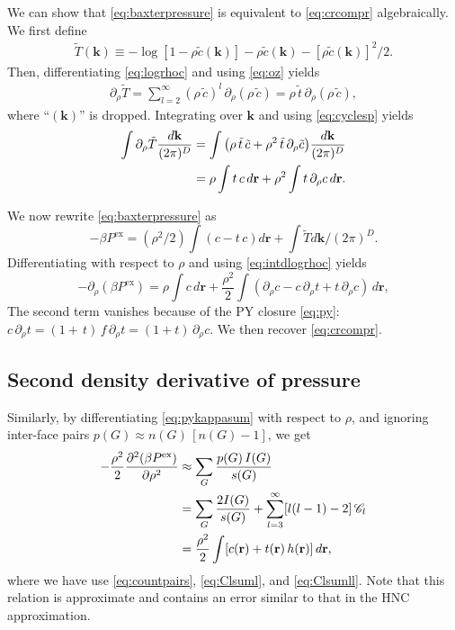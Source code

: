 \documentclass[notitlepage,preprint]{revtex4-1}
\newcommand{\vct}[1]{\mathbf{#1}}
\providecommand{\vr}{} %
\renewcommand{\vr}{\vct{r}}
\newcommand{\vk}{\vct{k}}
\newcommand{\dvk}{\frac{d\vk}{(2\pi)^D}}
\newcommand{\supex}[1]{ { { #1 }^{ \mathrm{ex} } } }
\newcommand{\Pex}{\supex{P}}
\newcommand{\Chn}{\mathscr{C}}
\begin{document}
We can show that
  \eqref{eq:baxterpressure} is equivalent to \eqref{eq:crcompr}
  algebraically.
%
We first define
%
\begin{align}
  \tilde{T}(\vk)
\equiv
  - \log[1 - \rho \tilde{c}(\vk)]
  - \rho \tilde{c}(\vk)
  - \left[ \rho \tilde{c}(\vk) \right]^2 / 2.
  \label{eq:logrhoc}
\end{align}
%
Then, differentiating \eqref{eq:logrhoc} and using \eqref{eq:oz} yields
%
\begin{align*}
  \partial_\rho \tilde T
=
  \sum_{l = 2}^{\infty}
    ( \rho \, \tilde{c} )^l
    \, \partial_\rho ( \rho \, \tilde{c} )
=
  \rho \, \tilde{t}
  \, \partial_\rho ( \rho \, \tilde{c} ),
\end{align*}
%
where ``$(\vk)$'' is dropped.
%
Integrating over $\vk$ and using \eqref{eq:cyclesp} yields
%
\begin{align}
  \int \partial_\rho \tilde T \dvk
&=
  \int
    \big(
      \rho \, \tilde{t} \, \tilde{c}
      +
      \rho^2 \, \tilde{t} \, \partial_\rho \tilde{c}
    \big) \dvk
\notag \\
&=
  \rho \int t \, c \, d\vr
      +
  \rho^2 \int t \, \partial_\rho c \, d\vr.
\label{eq:intdlogrhoc}
\end{align}



We now rewrite \eqref{eq:baxterpressure} as %
\[
  -\beta \Pex
=
  (\rho^2/2) \int (c - t \, c) d\vr
  + \int \tilde{T} d\vk/(2\pi)^D.
\]
%
Differentiating with respect to $\rho$ and using \eqref{eq:intdlogrhoc} yields
%
\[
  -\partial_\rho ( \beta \Pex )
=
  \rho \int c \, d\vr
  + \frac{\rho^2}{2} \int (
    \partial_\rho c - c \, \partial_\rho t + t \, \partial_\rho c
    ) \, d\vr,
\]
The second term vanishes because of the PY closure \eqref{eq:py}:
$c \, \partial_\rho t = (1 + \, t) \, f \, \partial_\rho t = (1 + t) \, \partial_\rho c$.
%
We then recover \eqref{eq:crcompr}.




\subsection*{Second density derivative of pressure}

Similarly,
  by differentiating \eqref{eq:pykappasum} with respect to $\rho$,
  and ignoring inter-face pairs $p(G) \approx n(G) \, [n(G) - 1]$,
  we get
%
\begin{align}
           -\frac{\rho^2}{2}
            \frac{\partial^2 ( \beta \Pex ) }
                 {\partial \rho^2}
  &\approx   \sum_G \frac{ p(G) \, I(G) }{ s(G) }
    \notag \\
  &=
            \sum_G \frac{2 I(G) }{s(G)}
            + \sum_{l = 3}^\infty [l(l-1) - 2] \, \Chn_l
    \notag \\
  &=         \frac{\rho^2}{2} \int [c(\vr) + t(\vr) \, h(\vr) ] \, d\vr,
\label{eq:pyddpressure}
\end{align}
%
where we have use \eqref{eq:countpairs}, \eqref{eq:Clsuml}, and \eqref{eq:Clsumll}.
%
Note that this relation is approximate
  and contains an error
  similar to that in the HNC approximation.
\end{document}
